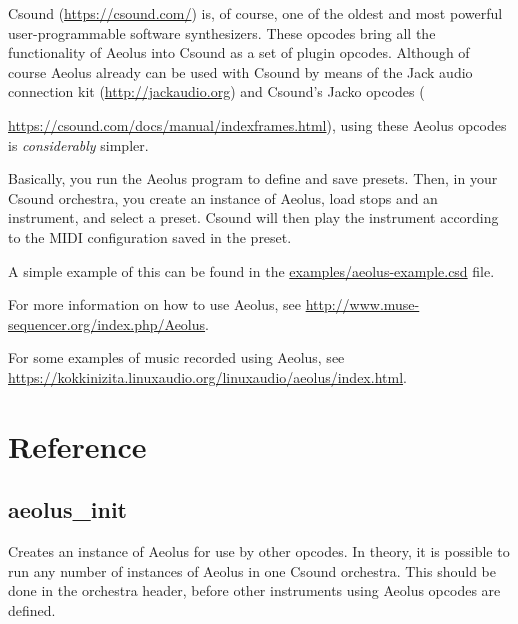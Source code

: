 \documentclass[english,11pt,letterpaper,onecolumn]{scrartcl}
\begin{document}
Csound (\url{https://csound.com/}) is, of course, one of the oldest and most
powerful user-programmable software synthesizers. These opcodes bring all the
functionality of Aeolus into Csound as a set of plugin opcodes. Although of
course Aeolus already can be used with Csound by means of the Jack audio
connection kit (\url{http://jackaudio.org}) and Csound's Jacko opcodes
({\url{https://csound.com/docs/manual/indexframes.html}), using these Aeolus
opcodes is \textit{considerably} simpler.

Basically, you run the Aeolus program to define and save presets. Then, in your
Csound orchestra, you create an instance of Aeolus, load stops and an
instrument, and select a preset. Csound will then play the instrument according
to the MIDI configuration saved in the preset.

A simple example of this can be found in the \url{examples/aeolus-example.csd}
file.

For more information on how to use Aeolus, see
\url{http://www.muse-sequencer.org/index.php/Aeolus}.

For some examples of music recorded using Aeolus, see
\url{https://kokkinizita.linuxaudio.org/linuxaudio/aeolus/index.html}.

\section{Reference}

\subsection*{aeolus\_init}

Creates an instance of Aeolus for use by other opcodes. In theory, it is
possible to run any number of instances of Aeolus in one Csound orchestra. This
should be done in the orchestra header, before other instruments using Aeolus
opcodes are defined.

}
\end{document}
